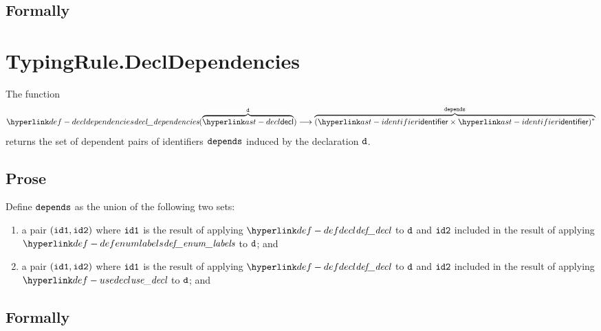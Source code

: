\subsection{Formally}
\begin{mathpar}
\end{mathpar}

\section{TypingRule.DeclDependencies \label{sec:TypingRule.DeclDependencies}}
\hypertarget{def-decldependencies}{}
The function
\[
\decldependencies(\overname{\decl}{\vd}) \aslto \overname{(\identifier\times\identifier)^*}{\dependencies}
\]
returns the set of dependent pairs of identifiers $\dependencies$ induced by the declaration $\vd$.

\subsection{Prose}
Define $\dependencies$ as the union of the following two sets:
\begin{enumerate}
  \item a pair $(\idone, \idtwo)$ where $\idone$ is the result of applying $\defdecl$ to $\vd$
        and $\idtwo$ included in the result of applying $\defenumlabels$ to $\vd$; and
  \item a pair $(\idone, \idtwo)$ where $\idone$ is the result of applying $\defdecl$ to $\vd$
        and $\idtwo$ included in the result of applying $\usedecl$ to $\vd$; and
\end{enumerate}

\subsection{Formally}
\begin{mathpar}
\end{mathpar}

